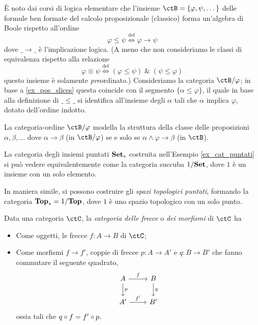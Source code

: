 \begin{example}\label{ex_boole_cpc}
	\`E noto dai corsi di logica elementare che l'insieme \(\ctB=\{\varphi,\psi,\dots\}\) delle formule ben formate del calcolo proposizionale (classico) forma un'algebra di Boole rispetto all'ordine
	\[\varphi\le\psi \overset{\text{def}}\iff \varphi \to \psi\]
	dove \(\_\to\_\) è l'implicazione logica. (A meno che non consideriamo le classi di equivalenza rispetto alla relazione
	\[\varphi\equiv\psi \overset{\text{def}}\iff (\varphi\le \psi) \; \& \; (\psi\le\varphi)\]
	questo insieme è solamente \emph{pre}ordinato.) Consideriamo la categoria \(\ctB/\varphi\); in base a \ref{ex_pos_slices} questa coincide con il segmento \(\{\alpha\le\varphi\}\), il quale in base alla definizione di \(\_\le\_\) si identifica all'insieme degli \(\alpha\) tali che \(\alpha\) implica \(\varphi\), dotato dell'ordine indotto.

	La categoria-ordine \(\ctB/\varphi\) modella la struttura della classe delle proposizioni \(\alpha,\beta,\dots\) dove \(\alpha \to \beta\) (in \(\ctB/\varphi\)) se e solo se \(\alpha \land \varphi \to \beta\) (in \(\ctB\)).
	\Todo{}
\end{example}
\begin{example}\label{def_spazi_pun_succuba}
	La categoria degli insiemi puntati \(\mathbf{Set}_*\) costruita nell'Esempio \ref{ex_cat_puntati} si può vedere equivalentemente come la categoria succuba \(1/\mathbf{Set}\), dove \(1\) è un insieme con un solo elemento.

	In maniera simile, si possono costruire gli \emph{spazi topologici puntati}, formando la categoria \(\mathbf{Top}_*=1/\mathbf{Top}\), dove \(1\) è uno spazio topologico con un solo punto.
\end{example}


\begin{definition}\label{def_cat_frecce}
	Data una categoria \(\ctC\), la \emph{categoria delle frecce} o \emph{dei morfismi} di \(\ctC\) ha
	\begin{itemize}
		\item Come oggetti, le frecce \(f:A\to B\) di \(\ctC\);
		\item Come morfismi \(f\to f'\), coppie di frecce \(p:A\to A'\) e \(q:B\to B'\) che fanno commutare il seguente quadrato,
		      \[
			      \begin{tikzcd}
				      A \ar{r}{f} \ar{d}{p} & B \ar{d}{q} \\
				      A' \ar{r}{f'} & B'
			      \end{tikzcd}
		      \]
		      ossia tali che \(q\circ f=f'\circ p\).
	\end{itemize}
\end{definition}

